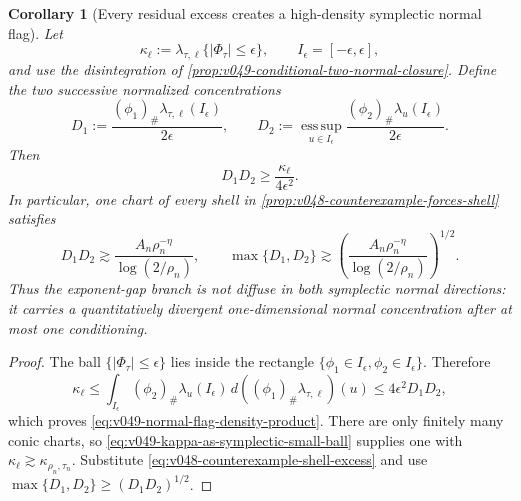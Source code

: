\documentclass[10pt]{article}
\newtheorem{corollary}[theorem]{Corollary}
\begin{document}
\begin{corollary}[Every residual excess creates a high-density symplectic normal flag]
\label{cor:v049-residual-excess-normal-flag}
Let
\[
\kappa_{\ell}
:=
\lambda_{\tau,\ell}\{|\Phi_\tau|\le\epsilon\},
\qquad
I_\epsilon=[-\epsilon,\epsilon],
\]
and use the disintegration of
\cref{prop:v049-conditional-two-normal-closure}.  Define the two successive normalized
concentrations
\begin{equation}
\label{eq:v049-two-stage-normal-densities}
D_1
:=
\frac{(\phi_1)_\#\lambda_{\tau,\ell}(I_\epsilon)}{2\epsilon},
\qquad
D_2
:=
\operatorname*{ess\,sup}_{u\in I_\epsilon}
\frac{(\phi_2)_\#\lambda_u(I_\epsilon)}{2\epsilon}.
\end{equation}
Then
\begin{equation}
\label{eq:v049-normal-flag-density-product}
\boxed{
D_1D_2
\ge
\frac{\kappa_\ell}{4\epsilon^2}.
}
\end{equation}
In particular, one chart of every shell in
\cref{prop:v048-counterexample-forces-shell} satisfies
\begin{equation}
\label{eq:v049-counterexample-normal-flag}
\boxed{
D_1D_2
\gtrsim
\frac{A_n\rho_n^{-\eta}}{\log(2/\rho_n)},
\qquad
\max\{D_1,D_2\}
\gtrsim
\left(
\frac{A_n\rho_n^{-\eta}}{\log(2/\rho_n)}
\right)^{1/2}.
}
\end{equation}
Thus the exponent-gap branch is not diffuse in both symplectic normal directions: it carries a
quantitatively divergent one-dimensional normal concentration after at most one conditioning.
\end{corollary}

\begin{proof}
The ball \(\{|\Phi_\tau|\le\epsilon\}\) lies inside the rectangle
\(\{\phi_1\in I_\epsilon,\phi_2\in I_\epsilon\}\).  Therefore
\[
\kappa_\ell
\le
\int_{I_\epsilon}
(\phi_2)_\#\lambda_u(I_\epsilon)
\,d((\phi_1)_\#\lambda_{\tau,\ell})(u)
\le
4\epsilon^2D_1D_2,
\]
which proves \eqref{eq:v049-normal-flag-density-product}.  There are only finitely many conic
charts, so \eqref{eq:v049-kappa-as-symplectic-small-ball} supplies one with
\(\kappa_\ell\gtrsim\kappa_{\rho_n,\tau_n}\).  Substitute
\eqref{eq:v048-counterexample-shell-excess} and use
\(\max\{D_1,D_2\}\ge(D_1D_2)^{1/2}\).
\end{proof}
\end{document}
